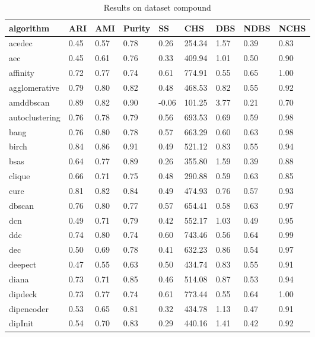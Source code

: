 \begin{table}[H]
\centering
\caption{Results on dataset compound}
\label{tab:params:compound}
\begin{tabular}{|l|l|l|l|l|l|l|l|l|}
\hline
algorithm & ARI & AMI & Purity & SS & CHS & DBS & NDBS & NCHS \\
\hline
acedec & 0.45 & 0.57 & 0.78 & 0.26 & 254.34 & 1.57 & 0.39 & 0.83 \\
\hline
aec & 0.45 & 0.61 & 0.76 & 0.33 & 409.94 & 1.01 & 0.50 & 0.90 \\
\hline
affinity & 0.72 & 0.77 & 0.74 & 0.61 & 774.91 & 0.55 & 0.65 & 1.00 \\
\hline
agglomerative & 0.79 & 0.80 & 0.82 & 0.48 & 468.53 & 0.82 & 0.55 & 0.92 \\
\hline
amddbscan & 0.89 & 0.82 & 0.90 & -0.06 & 101.25 & 3.77 & 0.21 & 0.70 \\
\hline
autoclustering & 0.76 & 0.78 & 0.79 & 0.56 & 693.53 & 0.69 & 0.59 & 0.98 \\
\hline
bang & 0.76 & 0.80 & 0.78 & 0.57 & 663.29 & 0.60 & 0.63 & 0.98 \\
\hline
birch & 0.84 & 0.86 & 0.91 & 0.49 & 521.12 & 0.83 & 0.55 & 0.94 \\
\hline
bsas & 0.64 & 0.77 & 0.89 & 0.26 & 355.80 & 1.59 & 0.39 & 0.88 \\
\hline
clique & 0.66 & 0.71 & 0.75 & 0.48 & 290.88 & 0.59 & 0.63 & 0.85 \\
\hline
cure & 0.81 & 0.82 & 0.84 & 0.49 & 474.93 & 0.76 & 0.57 & 0.93 \\
\hline
dbscan & 0.76 & 0.80 & 0.77 & 0.57 & 654.41 & 0.58 & 0.63 & 0.97 \\
\hline
dcn & 0.49 & 0.71 & 0.79 & 0.42 & 552.17 & 1.03 & 0.49 & 0.95 \\
\hline
ddc & 0.74 & 0.80 & 0.74 & 0.60 & 743.46 & 0.56 & 0.64 & 0.99 \\
\hline
dec & 0.50 & 0.69 & 0.78 & 0.41 & 632.23 & 0.86 & 0.54 & 0.97 \\
\hline
deepect & 0.47 & 0.55 & 0.63 & 0.50 & 434.74 & 0.83 & 0.55 & 0.91 \\
\hline
diana & 0.73 & 0.71 & 0.85 & 0.46 & 514.08 & 0.87 & 0.53 & 0.94 \\
\hline
dipdeck & 0.73 & 0.77 & 0.74 & 0.61 & 773.44 & 0.55 & 0.64 & 1.00 \\
\hline
dipencoder & 0.53 & 0.65 & 0.81 & 0.32 & 434.78 & 1.13 & 0.47 & 0.91 \\
\hline
dipInit & 0.54 & 0.70 & 0.83 & 0.29 & 440.16 & 1.41 & 0.42 & 0.92 \\

\end{tabular}
\end{table}
